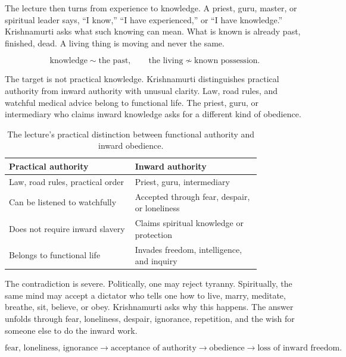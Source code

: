 \documentclass[11pt,oneside]{book}
\begin{document}
The lecture then turns from experience to knowledge. A priest, guru, master, or spiritual leader says, ``I know,'' ``I have experienced,'' or ``I have knowledge.'' Krishnamurti asks what such knowing can mean. What is known is already past, finished, dead. A living thing is moving and never the same.

\begin{equation}
\text{knowledge}
\sim
\text{the past},
\qquad
\text{the living}
\not\sim
\text{known possession}.
\end{equation}

The target is not practical knowledge. Krishnamurti distinguishes practical authority from inward authority with unusual clarity. Law, road rules, and watchful medical advice belong to functional life. The priest, guru, or intermediary who claims inward knowledge asks for a different kind of obedience.

\begin{table}
\centering
\begin{tabular}{p{0.42\linewidth}p{0.42\linewidth}}
\hline
\textbf{Practical authority} & \textbf{Inward authority} \\
\hline
Law, road rules, practical order & Priest, guru, intermediary \\
Can be listened to watchfully & Accepted through fear, despair, or loneliness \\
Does not require inward slavery & Claims spiritual knowledge or protection \\
Belongs to functional life & Invades freedom, intelligence, and inquiry \\
\hline
\end{tabular}
\caption{The lecture's practical distinction between functional authority and inward obedience.}
\end{table}

The contradiction is severe. Politically, one may reject tyranny. Spiritually, the same mind may accept a dictator who tells one how to live, marry, meditate, breathe, sit, believe, or obey. Krishnamurti asks why this happens. The answer unfolds through fear, loneliness, despair, ignorance, repetition, and the wish for someone else to do the inward work.

\begin{equation}
\text{fear, loneliness, ignorance}
\longrightarrow
\text{acceptance of authority}
\longrightarrow
\text{obedience}
\longrightarrow
\text{loss of inward freedom}.
\end{equation}
\end{document}
